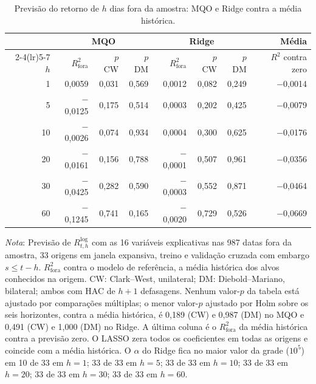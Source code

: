 \begin{table}[H]
\centering
\footnotesize
\caption{Previsão do retorno de $h$ dias fora da amostra: MQO e Ridge contra a média histórica.}
\label{tab:retlin-oos}
\begin{tabular}{rrrrrrrr}
\toprule
 & \multicolumn{3}{c}{MQO} & \multicolumn{3}{c}{Ridge} & Média \\ \cmidrule(lr){2-4}\cmidrule(lr){5-7}
$h$ & $R^2_{\text{fora}}$ & $p$ CW & $p$ DM & $R^2_{\text{fora}}$ & $p$ CW & $p$ DM & $R^2$ contra zero \\
\midrule
1 & 0{,}0059 & 0{,}031 & 0{,}569 & 0{,}0012 & 0{,}082 & 0{,}249 & $-$0{,}0014 \\
5 & $-$0{,}0125 & 0{,}175 & 0{,}514 & 0{,}0003 & 0{,}202 & 0{,}425 & $-$0{,}0079 \\
10 & $-$0{,}0026 & 0{,}074 & 0{,}934 & 0{,}0004 & 0{,}300 & 0{,}625 & $-$0{,}0176 \\
20 & $-$0{,}0161 & 0{,}156 & 0{,}788 & $-$0{,}0001 & 0{,}507 & 0{,}961 & $-$0{,}0356 \\
30 & $-$0{,}0425 & 0{,}282 & 0{,}590 & $-$0{,}0003 & 0{,}552 & 0{,}871 & $-$0{,}0464 \\
60 & $-$0{,}1245 & 0{,}741 & 0{,}165 & $-$0{,}0020 & 0{,}729 & 0{,}526 & $-$0{,}0669 \\
\bottomrule
\end{tabular}
\par\smallskip
\parbox{0.95\linewidth}{\footnotesize\textit{Nota}: Previsão de $R^{\log}_{t,h}$ com as 16 variáveis explicativas nas 987 datas fora da amostra, 33 origens em janela expansiva, treino e validação cruzada com embargo $s \le t-h$. $R^2_{\text{fora}}$ contra o modelo de referência, a média histórica dos alvos conhecidos na origem. CW: Clark--West, unilateral; DM: Diebold--Mariano, bilateral; ambos com HAC de $h+1$ defasagens. Nenhum valor-$p$ da tabela está ajustado por comparações múltiplas; o menor valor-$p$ ajustado por Holm sobre os seis horizontes, contra a média histórica, é 0{,}189 (CW) e 0{,}987 (DM) no MQO e 0{,}491 (CW) e 1{,}000 (DM) no Ridge. A última coluna é o $R^2_{\text{fora}}$ da média histórica contra a previsão zero. O LASSO zera todos os coeficientes em todas as origens e coincide com a média histórica. O $\alpha$ do Ridge fica no maior valor da grade ($10^5$) em 10 de 33 em $h = 1$; 33 de 33 em $h = 5$; 33 de 33 em $h = 10$; 33 de 33 em $h = 20$; 33 de 33 em $h = 30$; 33 de 33 em $h = 60$.}
\end{table}
